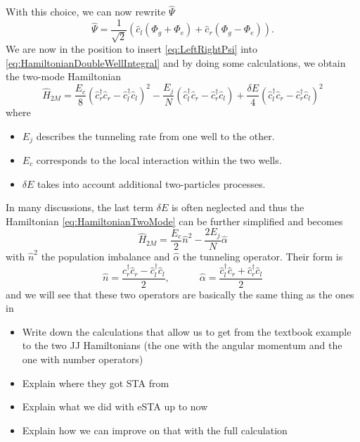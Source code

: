 With this choice, we can now rewrite $ \hat{\Psi} $ 
\begin{equation}
\label{eq:LeftRightPsi}
\hat{\Psi} = \frac{1}{\sqrt{2}}\left( \hat{c}_l(\Phi_g + \Phi_e) + \hat{c}_r(\Phi_g - \Phi_e) \right).
\end{equation}
We are now in the position to insert \cref{eq:LeftRightPsi} into \cref{eq:HamiltonianDoubleWellIntegral} and by doing some calculations, we obtain the two-mode Hamiltonian 
\begin{equation}
	\label{eq:HamiltonianTwoMode}
	\hat{H}_{2M} = \frac{E_{c}}{8}\left(\hat{c}_{r}^\dagger\hat{c}_{r} - \hat{c}_{l}^\dagger\hat{c}_{l}\right)^2 - \frac{ E_{j} }{N} \left(\hat{c}_{l}^\dagger\hat{c}_{r} - \hat{c}_{r}^\dagger\hat{c}_{l}\right) + \frac{\delta E}{4} \left(\hat{c}_{l}^\dagger\hat{c}_{r} - \hat{c}_{r}^\dagger\hat{c}_{l}\right)^{2}
\end{equation}
where 
\begin{itemize}
	\item $ E_{j} $ describes the tunneling rate from one well to the other.
	\item $ E_{c} $ corresponds to the local interaction within the two wells.
	\item $ \delta E $ takes into account additional two-particles processes.
\end{itemize}
In many discussions, the last term $ \delta E $ is often neglected and thus the Hamiltonian \cref{eq:HamiltonianTwoMode} can be further simplified and becomes
\begin{equation}
\label{eq:HamiltonianTwoModeFinal}
\hat{H}_{2M} = \frac{E_{c}}{2} \hat{n}^2 - \frac{2E_{j}}{N}\hat{\alpha}
\end{equation}
with $ \hat{n}^2 $ the population imbalance and $\hat{\alpha}$ the tunneling operator.
Their form is
\begin{equation}
\label{eq:JosephsonJuncitionOperators}
\hat{n} = \frac{\hat{c}_{r}^\dagger\hat{c}_{r} - \hat{c}_{l}^\dagger\hat{c}_{l}}{2}, \hspace{3em} \hat{ \alpha } = \frac{ \hat{c}_{l}^\dagger\hat{c}_{r} + \hat{c}_{r}^\dagger\hat{c}_{l}}{2}
\end{equation}
and we will see that these two operators are basically the same thing as the ones in  \cite{FastGenerationJulia2012}
\newpage
\begin{itemize}
	\item Write down the calculations that allow us to get from the textbook example to the two JJ Hamiltonians (the one with the angular momentum and the one with number operators)
	\item Explain where they got STA from 
	\item Explain what we did with eSTA up to now
	\item Explain how we can improve on that with the full calculation 
\end{itemize}
\newpage
 
 
